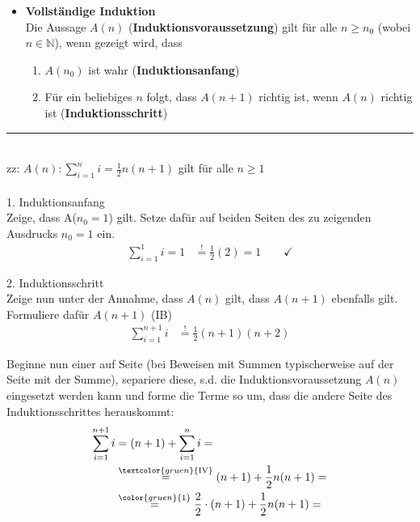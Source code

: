 \documentclass{article}
\newcommand{\comment}[1]{\textcolor{gruen}{\text{#1}}}
\newcommand{\commentmath}[1]{{\color{gruen}{#1}}}
\begin{document}
\begin{itemize}
	\item \textbf{Vollständige Induktion}\\
	Die Aussage $A(n)$ (\textbf{Induktionsvoraussetzung}) gilt für alle $n\geq n_0$ (wobei $n\in\mathbb{N}$), wenn gezeigt wird, dass
		\begin{enumerate}
			\setlength{\itemsep}{0cm}
			\item $A(n_0)$ ist wahr (\textbf{Induktionsanfang})
			\item Für ein beliebiges $n$ folgt, dass $A(n+1)$ richtig ist, wenn $A(n)$ richtig ist (\textbf{Induktionsschritt})
		\end{enumerate}
\end{itemize}


\newpage


{\color{blue}
\hrule
	\\
	zz: $A(n): \sum_{i=1}^n i = \frac{1}{2}n(n + 1)$ gilt für alle $n\geq 1$\\
	\\
	1. Induktionsanfang\\
	Zeige, dass A($n_0 = 1$) gilt. Setze dafür auf beiden Seiten des zu zeigenden Ausdrucks $n_0=1$ ein.
		\begin{align*}
			\sum_{i=1}^1 i = 1 &\stackrel{!}{=} \frac{1}{2}(2) = 1 \qquad\checkmark
		\end{align*}
	
	2. Induktionsschritt\\
	Zeige nun unter der Annahme, dass $A(n)$ gilt, dass $A(n+1)$ ebenfalls gilt.\\
	Formuliere dafür $A(n+1)$ (IB)
		\begin{align*}
			\sum_{i=1}^{n+1} i &\stackrel{!}{=} \frac{1}{2}(n + 1)(n + 2)
		\end{align*}
	
	Beginne nun einer auf Seite \textcolor{gruen}{(bei Beweisen mit Summen typischerweise auf der Seite mit der Summe)}, separiere diese, s.d. die Induktionsvoraussetzung $A(n)$ eingesetzt werden kann und forme die Terme so um, dass die andere Seite des Induktionsschrittes herauskommt:
		\begin{align*}
			\sum_{i=1}^{n+1} i &= (n + 1) + \sum_{i=1}^n i = \\
			&\stackrel{\comment{IV}}{=} (n + 1) + \frac{1}{2}n(n + 1) = \\
			&\stackrel{\commentmath{1}}{=} \frac{2}{2}\cdot(n + 1) + \frac{1}{2}n(n + 1) =
		\end{align*}
	
}
\end{document}
